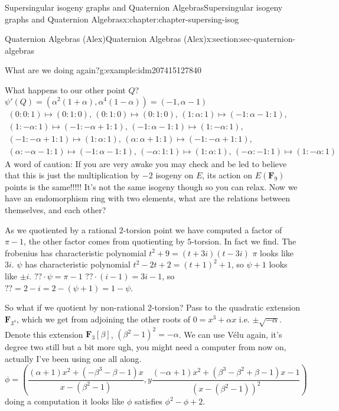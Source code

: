 \documentclass[oneside,10pt,]{book}
\numberwithin{equation}{section}
\newcommand{\lb}{[}
\newcommand{\rb}{]}
\newcommand{\FF}{\mathbf{F}}
\begin{document}
\begin{chapterptx}{Supersingular isogeny graphs and Quaternion Algebras}{}{Supersingular isogeny graphs and Quaternion Algebras}{}{}{x:chapter:chapter-supersing-isog}
\begin{sectionptx}{Quaternion Algebras (Alex)}{}{Quaternion Algebras (Alex)}{}{}{x:section:sec-quaternion-algebras}
\begin{introduction}{}
\begin{example}{What are we doing again?}{g:example:idm207415127840}
%
\par
What happens to our other point \(Q\)? \(\psi'(Q) = (\alpha^2(1+\alpha), \alpha^4(1-\alpha)) =(-1, \alpha - 1)\)%
\begin{gather*}
(0 : 0 : 1) \mapsto (0 : 1 : 0),\, (0 : 1 : 0) \mapsto (0 : 1 : 0),\, (1 : \alpha : 1) \mapsto (-1 : \alpha -1 : 1),\\
(1 : -\alpha : 1) \mapsto (-1 : -\alpha + 1 : 1),\, (-1 : \alpha -1 : 1) \mapsto (1 : -\alpha : 1),\\
(-1 : -\alpha + 1 : 1) \mapsto (1 : \alpha : 1),\, (\alpha : \alpha + 1 : 1) \mapsto (-1 : -\alpha + 1 : 1),\\
(\alpha : -\alpha -1 : 1) \mapsto (-1 : \alpha -1 : 1),\, (-\alpha : 1 : 1) \mapsto (1 : \alpha : 1),\, (-\alpha : -1 : 1) \mapsto (1 : -\alpha : 1)
\end{gather*}
A word of caution: If you are very awake you may check and be led to believe that this is just the multiplication by \(-2\) isogeny on \(E\), its action on \(E(\FF_9)\) points is the same!!!!! It's not the same isogeny though so you can relax. Now we have an endomorphism ring with two elements, what are the relations between themselves, and each other?%
\par
As we quotiented by a rational \(2\)-torsion point we have computed a factor of \(\pi - 1\), the other factor comes from quotienting by \(5\)-torsion. In fact we find. The frobenius has characteristic polynomial \(t^2 + 9 = (t + 3i)(t-3i)\) \(\pi\) looks like \(3i\). \(\psi\) has characteristic polynomial \(t^2 - 2t + 2 = (t+1)^2 + 1\), so \(\psi + 1\) looks like \(\pm i\). \(?? \cdot \psi = \pi - 1\)  \(?? \cdot (i - 1) = 3i - 1\), so \(?? = 2 - i = 2 - (\psi + 1) = 1 - \psi\).%
\par
So what if we quotient by non-rational 2-torsion? Pass to the quadratic extension \(\FF_{3^4}\), which we get from adjoining the other roots of \(0 = x^3 + \alpha x\) i.e. \(\pm \sqrt{-\alpha}\). Denote this extension \(\FF_3 \lb \beta \rb\),  \((\beta^2 - 1)^2 = -\alpha\). We can use Vélu again, it's degree two still but a bit more ugh, you might need a computer from now on, actually I've been using one all along.%
\begin{equation*}
\phi = \left( \frac{\left(\alpha + 1\right) x^{2} + \left(- \beta^{3}  -  \beta - 1\right) x}{x -   (\beta^{2} - 1)},y \frac{\left(-\alpha + 1\right) x^{2} + \left(\beta^{3}  -  \beta^{2} + \beta - 1\right) x -  1}{(x -  ( \beta^{2} - 1))^2} \right)
\end{equation*}
doing a computation it looks like \(\phi\) satisfies \(\phi^2 -\phi + 2\).%

\end{example}
\end{introduction}
\end{sectionptx}
\end{chapterptx}
\end{document}
